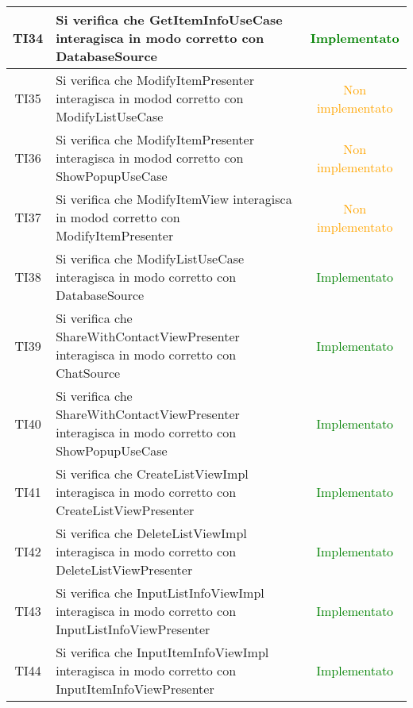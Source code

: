 \begin{center}
\begin{longtable}{|c|>{\centering}m{10cm}|c|}
		TI34 & Si verifica che GetItemInfoUseCase interagisca in modo corretto con DatabaseSource & \textcolor{Green}{Implementato}\\ \hline
		TI35 & Si verifica che ModifyItemPresenter interagisca in modod corretto con ModifyListUseCase & \textcolor{Orange}{Non implementato}\\ \hline
		TI36 & Si verifica che ModifyItemPresenter interagisca in modod corretto con ShowPopupUseCase & \textcolor{Orange}{Non implementato}\\ \hline
		TI37 & Si verifica che ModifyItemView interagisca in modod corretto con ModifyItemPresenter & \textcolor{Orange}{Non implementato}\\ \hline
		TI38 & Si verifica che ModifyListUseCase interagisca in modo corretto con DatabaseSource & \textcolor{Green}{Implementato}\\ \hline
		TI39 & Si verifica che ShareWithContactViewPresenter interagisca in modo corretto con ChatSource & \textcolor{Green}{Implementato}\\ \hline
		TI40 & Si verifica che ShareWithContactViewPresenter interagisca in modo corretto con ShowPopupUseCase & \textcolor{Green}{Implementato}\\ \hline
		TI41 & Si verifica che CreateListViewImpl interagisca in modo corretto con CreateListViewPresenter & \textcolor{Green}{Implementato}\\ \hline
		TI42 & Si verifica che DeleteListViewImpl interagisca in modo corretto con DeleteListViewPresenter & \textcolor{Green}{Implementato}\\ \hline
		TI43 & Si verifica che InputListInfoViewImpl interagisca in modo corretto con InputListInfoViewPresenter & \textcolor{Green}{Implementato}\\ \hline
		TI44 & Si verifica che InputItemInfoViewImpl interagisca in modo corretto con InputItemInfoViewPresenter & \textcolor{Green}{Implementato}\\ \hline
	\end{longtable}
\end{center}
